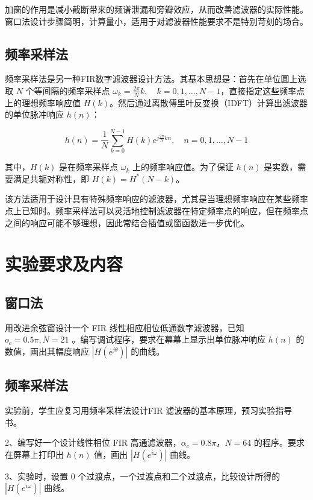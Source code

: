\documentclass[12pt,hyperref,a4paper,UTF8]{ctexart}
\begin{document}
加窗的作用是减小截断带来的频谱泄漏和旁瓣效应，从而改善滤波器的实际性能。窗口法设计步骤简明，计算量小，适用于对滤波器性能要求不是特别苛刻的场合。

\subsection{频率采样法}

频率采样法是另一种FIR数字滤波器设计方法。其基本思想是：首先在单位圆上选取 $N$ 个等间隔的频率采样点 $\omega_k = \frac{2\pi}{N}k, \quad k = 0, 1, \dots, N-1$，直接指定这些频率点上的理想频率响应值 $H(k)$。然后通过离散傅里叶反变换（IDFT）计算出滤波器的单位脉冲响应 $h(n)$：

$$ h(n) = \frac{1}{N} \sum_{k=0}^{N-1} H(k) e^{j\frac{2\pi}{N}kn}, \quad n = 0, 1, \dots, N-1 $$

其中，$H(k)$ 是在频率采样点 $\omega_k$ 上的频率响应值。为了保证 $h(n)$ 是实数，需要满足共轭对称性，即 $H(k) = H^* (N-k)$。

该方法适用于设计具有特殊频率响应的滤波器，尤其是当理想频率响应在某些频率点上已知时。频率采样法可以灵活地控制滤波器在特定频率点的响应，但在频率点之间的响应可能不够理想，因此常结合插值或窗函数进一步优化。

\section{实验要求及内容}

\subsection{窗口法}

用改进余弦窗设计一个 FIR 线性相应相位低通数字滤波器，已知 \(o_c = 0.5 \pi, N = 21\) 。编写调试程序，要求在幕幕上显示出单位脉冲响应 \(h(n)\) 的数值，画出其幅度响应 \(\left| H(e^{j\theta}) \right|\) 的曲线。

\subsection{频率采样法}
实验前，学生应复习用频率采样法设计FIR 滤波器的基本原理，预习实验指导书。

2、编写好一个设计线性相位 FIR 高通滤波器，\(\alpha_c = 0.8\pi\)，\(N = 64\) 的程序。要求在屏幕上打印出 \(h(n)\) 值，画出 \(\left|H(e^{i\omega})\right|\) 曲线。

3、实验时，设置 \(0\) 个过渡点，一个过渡点和二个过渡点，比较设计所得的 \(\left|H(e^{i\omega})\right|\) 曲线。
\end{document}
